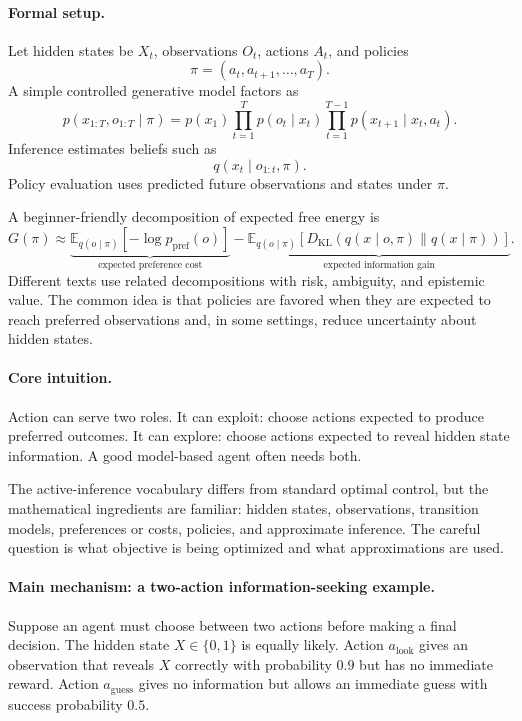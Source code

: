 \paragraph{Formal setup.}
Let hidden states be \(X_t\), observations \(O_t\), actions \(A_t\), and policies
\[
\pi=(a_t,a_{t+1},\ldots,a_T).
\]
A simple controlled generative model factors as
\[
p(x_{1:T},o_{1:T}\mid \pi)
=p(x_1)\prod_{t=1}^T p(o_t\mid x_t)
\prod_{t=1}^{T-1}p(x_{t+1}\mid x_t,a_t).
\]
Inference estimates beliefs such as
\[
q(x_t\mid o_{1:t},\pi).
\]
Policy evaluation uses predicted future observations and states under \(\pi\).

A beginner-friendly decomposition of expected free energy is
\[
\boxed{
G(\pi)
\approx
\underbrace{\mathbb E_{q(o\mid\pi)}[-\log p_{\mathrm{pref}}(o)]}_{\text{expected preference cost}}
-
\underbrace{\mathbb E_{q(o\mid\pi)}
\left[
D_{\mathrm{KL}}(q(x\mid o,\pi)\|q(x\mid\pi))
\right]}_{\text{expected information gain}}.
}
\]
Different texts use related decompositions with risk, ambiguity, and epistemic value. The common idea is that policies are favored when they are expected to reach preferred observations and, in some settings, reduce uncertainty about hidden states.

\paragraph{Core intuition.}
Action can serve two roles. It can exploit: choose actions expected to produce preferred outcomes. It can explore: choose actions expected to reveal hidden state information. A good model-based agent often needs both.

The active-inference vocabulary differs from standard optimal control, but the mathematical ingredients are familiar: hidden states, observations, transition models, preferences or costs, policies, and approximate inference. The careful question is what objective is being optimized and what approximations are used.

\paragraph{Main mechanism: a two-action information-seeking example.}
Suppose an agent must choose between two actions before making a final decision. The hidden state \(X\in\{0,1\}\) is equally likely. Action \(a_{\mathrm{look}}\) gives an observation that reveals \(X\) correctly with probability \(0.9\) but has no immediate reward. Action \(a_{\mathrm{guess}}\) gives no information but allows an immediate guess with success probability \(0.5\).

